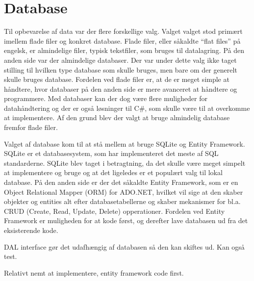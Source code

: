 \section{Database}
Til opbevarelse af data var der flere forskellige valg. Valget valget stod primært imellem flade filer og konkret database. Flade filer, eller såkaldte ``flat files'' på engelsk, er almindelige filer, typisk tekstfiler, som bruges til datalagring. På den anden side var der almindelige databaser. Der var under dette valg ikke taget stilling til hvilken type database som skulle bruges, men bare om der generelt skulle bruges database. 
Fordelen ved flade filer er, at de er meget simple at håndtere, hvor databaser på den anden side er mere avanceret at håndtere og programmere. Med databaser kan der dog være flere muligheder for datahåndtering og der er også løsninger til C#, som skulle være til at overkomme at implementere.\citep{flatfiles} Af den grund blev der valgt at bruge almindelig database fremfor flade filer. 

Valget af database kom til at stå mellem at bruge SQLite og Entity Framework. SQLite er et databasesystem, som har implementeret det meste af SQL standarderne. SQLite blev taget i betragtning, da det skulle være meget simpelt at implementere og bruge og at det ligeledes er et populært valg til lokal database. På den anden side er der det såkaldte Entity Framework, som er en Object Relational Mapper (ORM) for ADO.NET, hvilket vil sige at den skaber objekter og entities alt efter databasetabellerne og skaber mekanismer for bl.a. CRUD (Create, Read, Update, Delete) opperationer. \citep{entity} 
Fordelen ved Entity Framework er muligheden for at kode først, og derefter lave databasen ud fra det eksisterende kode. 


DAL interface gør det udafhængig af databasen så den kan skiftes ud. 
Kan også test. 

Relativt nemt at implementere, entity framework code first.




